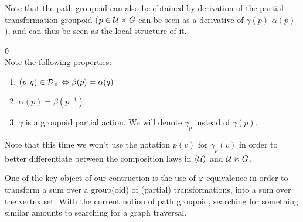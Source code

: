 \begin{remark}Note that the path groupoid can also be obtained by derivation of the partial transformation groupoid (\ie $p \in \mathcal{U} \ltimes G$ can be seen as a derivative of $\gamma(p)$ \wrt $\alpha(p)$), and can thus be seen as the local structure of it.
\end{remark}

\begin{lemma}\h{0}\\
Note the following properties:
\begin{enumerate}
  \item $(p,q) \in \mathcal{D}_{\ltimes} \Leftrightarrow \beta(p) = \alpha(q)$
  \item $\alpha(p) = \beta(p^{-1})$
  \item $\gamma$ is a groupoid partial action. We will denote $\gamma_p$ instead of $\gamma(p)$. \label{enum:3}
\end{enumerate}
\end{lemma}

\begin{remark}
Note that this time we won't use the notation $p(v)$ for $\gamma_p(v)$ in order to better differentiate between the composition laws in $\langle \mathcal{U} \rangle$ and $\mathcal{U} \ltimes G$.
\end{remark}

One of the key object of our contruction is the use of $\varphi$-equivalence in order to transform a sum over a group(oid) of (partial) transformations, into a sum over the vertex set. With the current notion of path groupoid, searching for something similar amounts to searching for a graph traversal.

